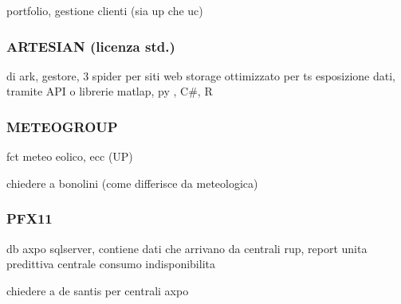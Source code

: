 portfolio, gestione clienti (sia up che uc)

\subsubsection{ARTESIAN (licenza std.)}
    di ark, gestore, 3
        spider per siti web
        storage ottimizzato per ts
        esposizione dati, tramite API o librerie matlap, py , C\#, R
\subsubsection{METEOGROUP}
    fct meteo eolico, ecc (UP)
    
    chiedere a bonolini (come differisce da meteologica)
\subsubsection{PFX11}
    db axpo sqlserver, contiene dati che arrivano da centrali
        rup, report unita predittiva centrale
        consumo
        indisponibilita
    
    chiedere a de santis per centrali axpo

